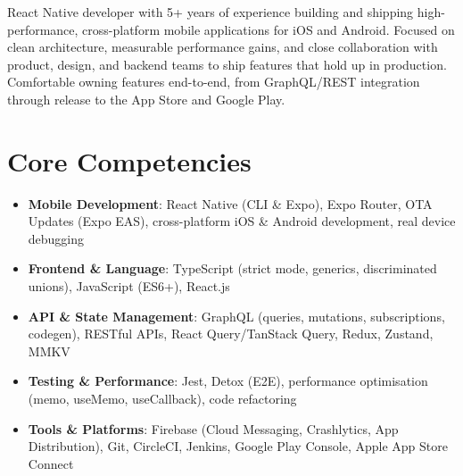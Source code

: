 \documentclass[11pt,a4paper,sans]{moderncv}
\begin{document}
\makecvtitle


\vspace{6pt}
\small{React Native developer with 5+ years of experience building and shipping high-performance, cross-platform mobile applications for iOS and Android. Focused on clean architecture, measurable performance gains, and close collaboration with product, design, and backend teams to ship features that hold up in production. Comfortable owning features end-to-end, from GraphQL/REST integration through release to the App Store and Google Play.}


\section{Core Competencies}
\vspace{1pt}
\begin{itemize}

\item \textbf{Mobile Development}: React Native (CLI \& Expo), Expo Router, OTA Updates (Expo EAS), cross-platform iOS \& Android development, real device debugging

\item \textbf{Frontend \& Language}: TypeScript (strict mode, generics, discriminated unions), JavaScript (ES6+), React.js

\item \textbf{API \& State Management}: GraphQL (queries, mutations, subscriptions, codegen), RESTful APIs, React Query/TanStack Query, Redux, Zustand, MMKV

\item \textbf{Testing \& Performance}: Jest, Detox (E2E), performance optimisation (memo, useMemo, useCallback), code refactoring

\item \textbf{Tools \& Platforms}: Firebase (Cloud Messaging, Crashlytics, App Distribution), Git, CircleCI, Jenkins, Google Play Console, Apple App Store Connect

\end{itemize}

\end{document}
